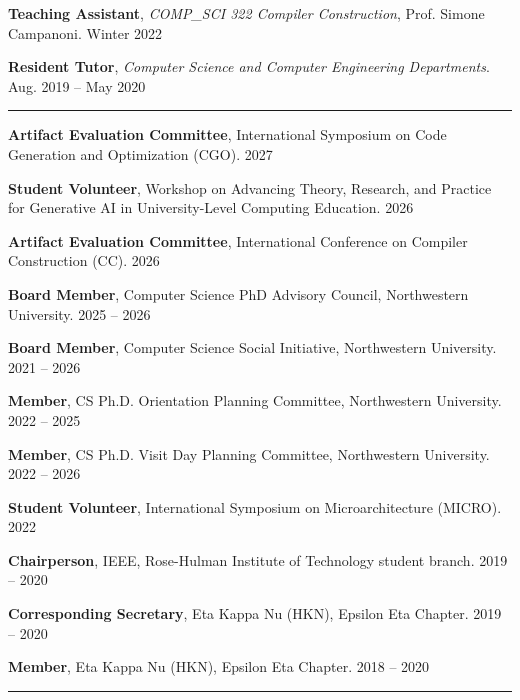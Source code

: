 \documentclass{article}
\begin{document}
\textbf{Teaching Assistant}, {\em COMP\_SCI 322 Compiler Construction}, Prof. Simone Campanoni. \hfill Winter 2022

\textbf{Resident Tutor}, {\em Computer Science and Computer Engineering Departments}. \hfill Aug. 2019 -- May 2020


    
\vspace{1em}
\hrule
\vspace{0.5em}

\vspace{0.5em}


\textbf{Artifact Evaluation Committee}, International Symposium on Code Generation and Optimization (CGO). \hfill 2027

\textbf{Student Volunteer}, Workshop on Advancing Theory, Research, and Practice for Generative AI in University-Level Computing Education. \hfill 2026

\textbf{Artifact Evaluation Committee}, International Conference on Compiler Construction (CC). \hfill 2026

\textbf{Board Member}, Computer Science PhD Advisory Council, Northwestern University. \hfill 2025 -- 2026

\textbf{Board Member}, Computer Science Social Initiative, Northwestern University. \hfill 2021 -- 2026

\textbf{Member}, CS Ph.D. Orientation Planning Committee, Northwestern University. \hfill 2022 -- 2025

\textbf{Member}, CS Ph.D. Visit Day Planning Committee, Northwestern University. \hfill 2022 -- 2026

\textbf{Student Volunteer}, International Symposium on Microarchitecture (MICRO). \hfill 2022

\textbf{Chairperson}, IEEE, Rose-Hulman Institute of Technology student branch. \hfill 2019 -- 2020

\textbf{Corresponding Secretary}, Eta Kappa Nu (HKN), Epsilon Eta Chapter. \hfill 2019 -- 2020

\textbf{Member}, Eta Kappa Nu (HKN), Epsilon Eta Chapter. \hfill 2018 -- 2020


\vspace{1em}
\hrule
\vspace{0.5em}

\vspace{0.5em}
\end{document}
